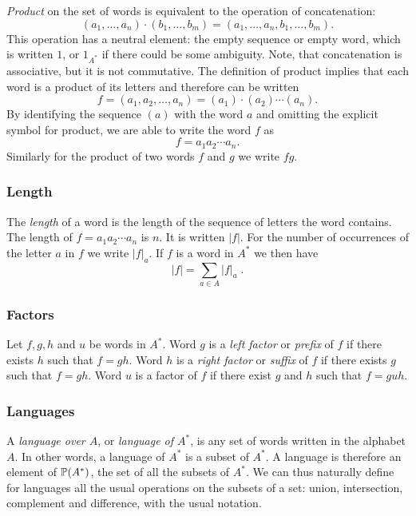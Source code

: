 \emph{Product} on the set of words is equivalent to the operation of concatenation:
\[
    (a_1, \dotsc, a_n) \cdot (b_1, \dotsc, b_m) = (a_1, \dotsc, a_n, b_1, \dotsc, b_m).
\]
This operation has a neutral element: the empty sequence or empty word, which is written $1$, or $1_{A^*}$ if there could be some ambiguity. Note, that concatenation is associative, but it is not commutative. The definition of product implies that each word is a product of its letters and therefore can be written
\[
    f = (a_1, a_2, \dotsc, a_n) = (a_1) \cdot (a_2) \dotsm (a_n).
\]
By identifying the sequence $(a)$ with the word $a$ and omitting the explicit symbol for product, we are able to write the word $f$ as
\[
    f = a_1 a_2 \dotsm a_n.
\]
Similarly for the product of two words $f$ and $g$ we write $fg$.

\subsubsection*{Length}

The \emph{length} of a word is the length of the sequence of letters the word contains. The length of $f = a_1 a_2 \dotsm a_n$ is $n$. It is written $|f|$. For the number of occurrences of the letter $a$ in $f$ we write $|f|_a$. If $f$ is a word in $A^*$ we then have
\[
    |f| = \sum_{a \in A} |f|_a \; .
\]

\subsubsection*{Factors}

Let $f, g, h$ and $u$ be words in $A^*$. Word $g$ is a \emph{left factor} or \emph{prefix} of $f$ if there exists $h$ such that $f = g h$. Word $h$ is a \emph{right factor} or \emph{suffix} of $f$ if there exists $g$ such that $f = g h$. Word $u$ is a factor of $f$ if there exist $g$ and $h$ such that $f = g u h$.

\subsubsection*{Languages}

A \emph{language over $A$}, or \emph{language of $A^*$}, is any set of words written in the alphabet $A$. In other words, a language of $A^*$ is a subset of $A^*$. A language is therefore an element of $\mathbb{P}(A^*)$, the set of all the subsets of $A^*$. We can thus naturally define for languages all the usual operations on the subsets of a set: union, intersection, complement and difference, with the usual notation.

